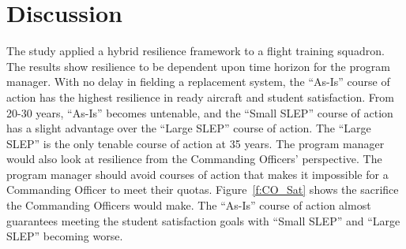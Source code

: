 \documentclass[preprint,12pt]{elsarticle}
\begin{document}
\section{Discussion}
\label{s:Disc}


The study applied a hybrid resilience framework to a flight training
squadron. The results show resilience to be dependent upon time horizon for the
program manager. With no delay in fielding a replacement system, the
``As-Is'' course of action has the highest resilience in ready
aircraft and student satisfaction. From 20-30 years, ``As-Is'' becomes
untenable, and the ``Small SLEP'' course of action has a slight
advantage over the ``Large SLEP'' course of action. The
``Large SLEP'' is the only tenable course of action at 35 years. The
program manager would also look at resilience from the Commanding
Officers' perspective. The program manager should avoid courses of action that makes it impossible for
a Commanding Officer to meet their quotas. Figure~\ref{f:CO_Sat} shows
the sacrifice the Commanding Officers would make. The ``As-Is'' course
of action almost guarantees meeting the student satisfaction goals
with ``Small SLEP'' and ``Large SLEP'' becoming worse.



\end{document}
